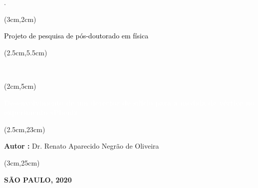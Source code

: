 \begin{titlepage}.
    

    \vspace{3.5cm}

    
    \begin{textblock*}{15cm}(3cm,2cm)
        \begin{Huge}
            \begin{center}
                \makeatletter
                \noindent\textcolor{black}{ Projeto de pesquisa de pós-doutorado em física}
                \makeatother
            \end{center}
        \end{Huge}
    \end{textblock*}
    
    \begin{textblock*}{15cm}(2.5cm,5.5cm)
        \makeatletter
        \begin{LARGE}
            \begin{center}
                \color{black}
                {\it  }\\
            \end{center}
         \end{LARGE}
     
    \end{textblock*}
    
    \begin{textblock*}{17.5cm}(2cm,5cm)
        \begin{Huge}
            \begin{center}
                \makeatletter
                \noindent\textcolor{white}{\textbf{Desenvolvimento de um detector de silício para a medida de vértice no experimento sPhenix}}
                \makeatother
            \end{center}
        \end{Huge}
    \end{textblock*}

    \begin{textblock*}{15cm}(2.5cm,23cm)
        \begin{LARGE}
        \begin{center}
            \color{white}
                \textbf{Autor :} Dr. Renato Aparecido Negrão de Oliveira 
        \end{center}
            
        \end{LARGE}
        
    \end{textblock*}
    
    \begin{textblock*}{15cm}(3cm,25cm)
        \makeatletter
        \begin{center}
            {\color{white}
                \textbf{SÃO PAULO, 2020} 
            }
        \end{center}
        \makeatother
    \end{textblock*}

\end{titlepage}
